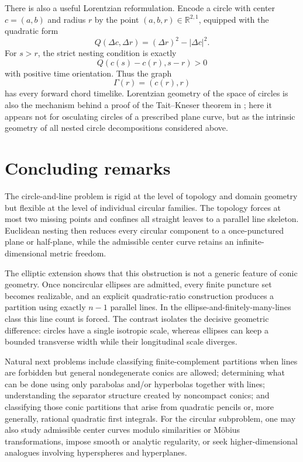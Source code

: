 \documentclass[11pt]{article}
\newcommand{\R}{\mathbb{R}}
\begin{document}
There is also a useful Lorentzian reformulation. Encode a circle with center $c=(a,b)$ and radius $r$ by the point $(a,b,r)\in\R^{2,1}$, equipped with the quadratic form
\[
Q(\Delta c,\Delta r)=(\Delta r)^2-|\Delta c|^2.
\]
For $s>r$, the strict nesting condition is exactly
\[
Q(c(s)-c(r),s-r)>0
\]
with positive time orientation. Thus the graph
\[
\Gamma(r)=(c(r),r)
\]
has every forward chord timelike. Lorentzian geometry of the space of circles is also the mechanism behind a proof of the Tait--Kneser theorem in \cite{BorJackmanTabachnikov}; here it appears not for osculating circles of a prescribed plane curve, but as the intrinsic geometry of all nested circle decompositions considered above.

\section{Concluding remarks}

The circle-and-line problem is rigid at the level of topology and domain geometry but flexible at the level of individual circular families. The topology forces at most two missing points and confines all straight leaves to a parallel line skeleton. Euclidean nesting then reduces every circular component to a once-punctured plane or half-plane, while the admissible center curve retains an infinite-dimensional metric freedom.

The elliptic extension shows that this obstruction is not a generic feature of conic geometry. Once noncircular ellipses are admitted, every finite puncture set becomes realizable, and an explicit quadratic-ratio construction produces a partition using exactly $n-1$ parallel lines. In the ellipse-and-finitely-many-lines class this line count is forced. The contrast isolates the decisive geometric difference: circles have a single isotropic scale, whereas ellipses can keep a bounded transverse width while their longitudinal scale diverges.

Natural next problems include classifying finite-complement partitions when lines are forbidden but general nondegenerate conics are allowed; determining what can be done using only parabolas and/or hyperbolas together with lines; understanding the separator structure created by noncompact conics; and classifying those conic partitions that arise from quadratic pencils or, more generally, rational quadratic first integrals. For the circular subproblem, one may also study admissible center curves modulo similarities or M\"obius transformations, impose smooth or analytic regularity, or seek higher-dimensional analogues involving hyperspheres and hyperplanes.
\end{document}

